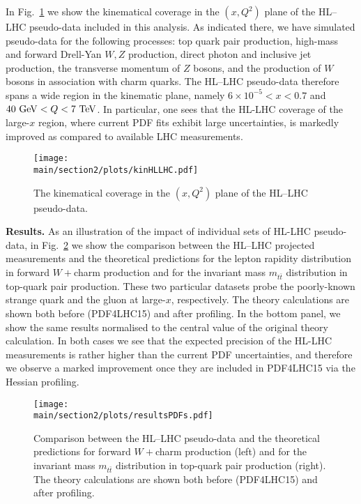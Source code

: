 In Fig.~\ref{fig:kinHLLHC} we show the
kinematical coverage in the $(x,Q^2)$ plane of the
  HL--LHC pseudo-data included in this analysis.
  As indicated there, we have simulated pseudo-data for
  the following processes: top quark pair production,
  high-mass and forward Drell-Yan $W,Z$ production, direct
  photon and inclusive jet production, the transverse momentum
  of $Z$ bosons, and the production of $W$ bosons in association
  with charm quarks.
  The HL--LHC pseudo-data therefore spans a wide region in the kinematic
  plane, namely $6\times 10^{-5} < x < 0.7$ and
  $40~{\rm GeV} < Q < 7~{\rm TeV}$.
  In particular, one sees that the HL-LHC coverage of the large-$x$ region,
  where current PDF fits exhibit large uncertainties,
  is markedly improved as compared to available LHC
  measurements.
  
\begin{figure}[t]
\centering
\texttt{[image: \\main/section2/plots/kinHLLHC.pdf]}
\caption{\small 
  The kinematical coverage in the $(x,Q^2)$ plane of the
  HL--LHC pseudo-data.
 \label{fig:kinHLLHC}} 
\end{figure}

{\bf Results.}
%
As an illustration of the impact of individual sets
of HL-LHC pseudo-data,
in Fig.~\ref{fig:resultsPDFs.pdf} we show 
the comparison between the HL--LHC projected measurements
and the theoretical predictions for the lepton
rapidity distribution in forward $W+$charm production
  and for the invariant mass $m_{t\bar{t}}$ distribution in top-quark
  pair production. These two particular datasets probe the poorly-known strange quark and
  the gluon at large-$x$, respectively.
   The theory calculations are shown both before (PDF4LHC15)
   and after profiling.
  In the bottom panel, we show the same results normalised
  to the central value of the original theory calculation.
  In both cases we see that the expected precision of the HL-LHC
  measurements is rather higher than the current PDF uncertainties,
  and therefore we observe a marked improvement once they
  are included in PDF4LHC15 via the Hessian profiling.
  

\begin{figure}[t]
  \begin{center}
\texttt{[image: \\main/section2/plots/resultsPDFs.pdf]}
\caption{\small Comparison between the HL--LHC pseudo-data
  and the theoretical predictions for forward $W+$charm production (left)
  and for the invariant mass $m_{t\bar{t}}$ distribution in top-quark
  pair production (right).
   The theory calculations are shown both before (PDF4LHC15)
   and after profiling.
       \label{fig:resultsPDFs.pdf} }
  \end{center}
\end{figure}

